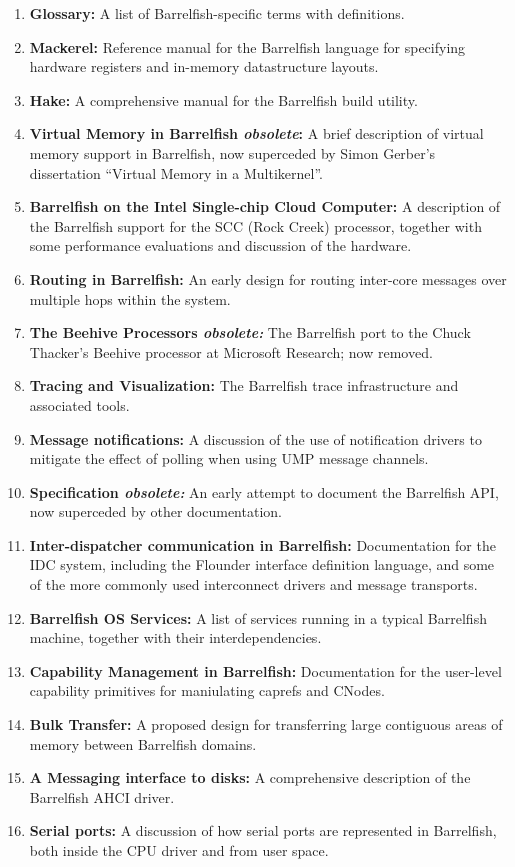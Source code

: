 \documentclass[a4paper,twoside]{report} %
\begin{document}
\begin{enumerate}
\item \textbf{Glossary:} A list of Barrelfish-specific terms with
  definitions. 
\item \textbf{Mackerel:} Reference manual for the Barrelfish language
  for specifying hardware registers and in-memory datastructure
  layouts. 
\item \textbf{Hake:} A comprehensive manual for the Barrelfish build
  utility. 
\item \textbf{Virtual Memory in Barrelfish \textit{obsolete}:} A brief
  description of virtual memory support in Barrelfish, now superceded
  by Simon Gerber's dissertation ``Virtual Memory in a Multikernel''. 
\item \textbf{Barrelfish on the Intel Single-chip Cloud Computer:} A
  description of the Barrelfish support for the SCC (Rock Creek)
  processor, together with some performance evaluations and discussion
  of the hardware. 
\item \textbf{Routing in Barrelfish:} An early design for routing
  inter-core messages over multiple hops within the system.
\item \textbf{The Beehive Processors \textit{obsolete:}} The
  Barrelfish port to the Chuck Thacker's Beehive processor at
  Microsoft Research; now removed. 
\item \textbf{Tracing and Visualization:} The Barrelfish trace
  infrastructure and associated tools.
\item \textbf{Message notifications:} A discussion of the use of notification
  drivers to mitigate the effect of polling when using UMP message
  channels. 
\item \textbf{Specification \textit{obsolete:}} An early attempt to
  document the Barrelfish API, now superceded by other documentation.
\item \textbf{Inter-dispatcher communication in Barrelfish:}
  Documentation for the IDC system, including the Flounder interface
  definition language, and some of the more commonly used interconnect
  drivers and message transports.
\item \textbf{Barrelfish OS Services:} A list of services running in a
  typical Barrelfish machine, together with their interdependencies.
\item \textbf{Capability Management in Barrelfish:} Documentation
  for the user-level capability primitives for maniulating caprefs and
  CNodes. 
\item \textbf{Bulk Transfer:} A proposed design for transferring large
  contiguous areas of memory between Barrelfish domains.
\item \textbf{A Messaging interface to disks:} A comprehensive
  description of the Barrelfish AHCI driver. 
\item \textbf{Serial ports:} A discussion of how serial ports are
  represented in Barrelfish, both inside the CPU driver and from user
  space. 
\end{enumerate}
\end{document}

